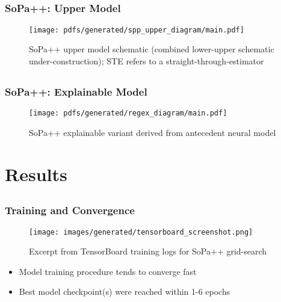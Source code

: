\documentclass[10pt]{beamer}
\let\oldcitep=\citep
\renewcommand\citep[1]{{\textcolor{blue}{\oldcitep{#1}}}}
\begin{document}
\subsection{}
\begin{frame}
  \frametitle{SoPa++: Upper Model}
  \begin{figure}				       
    \captionsetup{justification=centering}
    \texttt{[image: pdfs/generated/spp\_upper\_diagram/main.pdf]}
    \caption{SoPa++ upper model schematic (combined lower-upper schematic under-construction); STE refers to a straight-through-estimator \citep{yin2019understanding}}
  \end{figure}
\end{frame}

\subsection{}
\begin{frame}
  \frametitle{SoPa++: Explainable Model}
  \begin{figure}				       
    \captionsetup{justification=centering}
    \texttt{[image: pdfs/generated/regex\_diagram/main.pdf]}
    \caption{SoPa++ explainable variant derived from antecedent neural model}
  \end{figure}
\end{frame} 

\section{Results}
\subsection{}
\begin{frame}
  \frametitle{Training and Convergence}
  \begin{figure}				       
    \captionsetup{justification=centering}
    \texttt{[image: images/generated/tensorboard\_screenshot.png]}
    \caption{Excerpt from TensorBoard training logs for SoPa++ grid-search}
  \end{figure}
  \begin{itemize}
    \item Model training procedure tends to converge fast
    \item Best model checkpoint(s) were reached within 1-6 epochs
  \end{itemize} 
\end{frame} 
\end{document}
